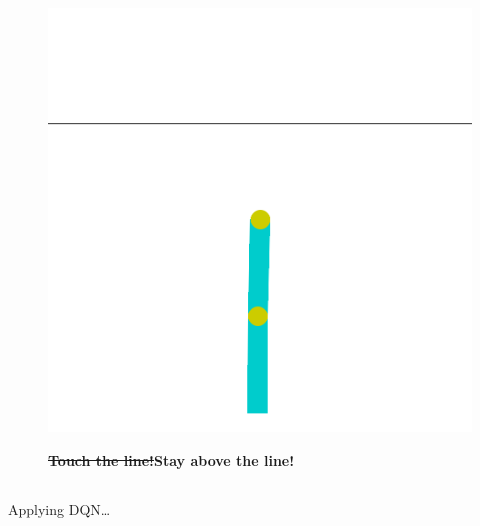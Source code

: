 \documentclass[
  letterpaper,
  DIV=11,
  numbers=noendperiod,
  oneside]{scrartcl}
\begin{document}
\begin{figure}

\begin{minipage}{0.65\linewidth}
\includegraphics{figs/acrobot.gif}\end{minipage}%
%
\begin{minipage}{0.35\linewidth}
\st{\textbf{Touch the line!}}\textbf{Stay above the
line!}\end{minipage}%

\end{figure}%

\subsection{}\label{section-15}

Applying DQN\ldots{}
\end{document}
